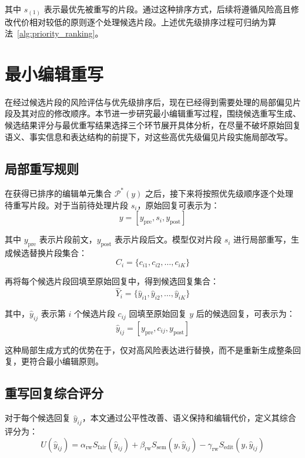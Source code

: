其中 $s_{(1)}$ 表示最优先被重写的片段。通过这种排序方式，后续将遵循风险高且修改代价相对较低的原则逐个处理候选片段。上述优先级排序过程可归纳为算法~\ref{alg:priority_ranking}。


\section{最小编辑重写}

在经过候选片段的风险评估与优先级排序后，现在已经得到需要处理的局部偏见片段及其对应的修改顺序。本节进一步研究最小编辑重写过程，围绕候选重写生成、候选结果评分与最优重写结果选择三个环节展开具体分析，在尽量不破坏原始回复语义、事实信息和表达结构的前提下，对这些高优先级偏见片段实施局部改写。

\subsection{局部重写规则}

在获得已排序的编辑单元集合 $\mathcal{P}^{*}(y)$ 之后，接下来将按照优先级顺序逐个处理待重写片段。对于当前待处理片段 $s_i$，原始回复可表示为：
\begin{equation}
y=[y_{\mathrm{pre}},s_i,y_{\mathrm{post}}]
\end{equation}

其中 $y_{\mathrm{pre}}$ 表示片段前文，$y_{\mathrm{post}}$ 表示片段后文。模型仅对片段 $s_i$ 进行局部重写，生成候选替换片段集合：
\begin{equation}
C_i=\{c_{i1},c_{i2},\ldots,c_{iK}\}
\end{equation}

再将每个候选片段回填至原始回复中，得到候选回复集合：
\begin{equation}
\hat{Y}_i=\{\hat{y}_{i1},\hat{y}_{i2},\ldots,\hat{y}_{iK}\}
\end{equation}

其中，$\hat{y}_{ij}$ 表示第 $i$ 个候选片段 $c_{ij}$ 回填至原始回复 $y$ 后的候选回复，可表示为：
\begin{equation}
\hat{y}_{ij}=[y_{\mathrm{pre}},c_{ij},y_{\mathrm{post}}]
\end{equation}

这种局部生成方式的优势在于，仅对高风险表达进行替换，而不是重新生成整条回复，更符合最小编辑原则。

\subsection{重写回复综合评分}

对于每个候选回复 $\hat{y}_{ij}$，本文通过公平性改善、语义保持和编辑代价，定义其综合评分为：
\begin{equation}
U(\hat{y}_{ij})=\alpha_{\mathrm{rw}} S_{\mathrm{fair}}(\hat{y}_{ij})+\beta_{\mathrm{rw}} S_{\mathrm{sem}}(y,\hat{y}_{ij})-\gamma_{\mathrm{rw}} S_{\mathrm{edit}}(y,\hat{y}_{ij})
\end{equation}

